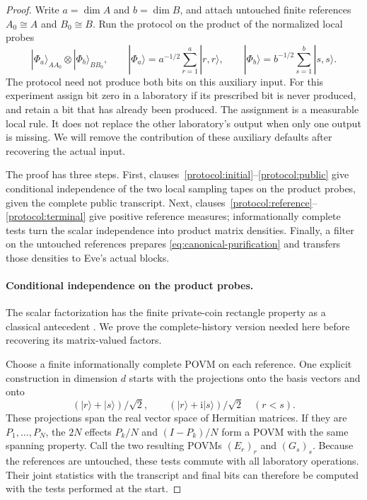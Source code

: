 \begin{proof}
Write $a=\dim A$ and $b=\dim B$, and attach untouched finite references
$A_0\cong A$ and $B_0\cong B$.  Run the protocol on the product of the
normalized local probes
\begin{equation}\label{eq:local-probes}
 |\Phi_a\rangle_{AA_0}\otimes|\Phi_b\rangle_{BB_0},
 \qquad
 |\Phi_a\rangle=a^{-1/2}\sum_{r=1}^{a}|r,r\rangle,
 \qquad
 |\Phi_b\rangle=b^{-1/2}\sum_{s=1}^{b}|s,s\rangle.
\end{equation}
The protocol need not produce both bits on this auxiliary input.  For
this experiment assign bit zero in a laboratory if its prescribed bit
is never produced, and retain a bit that has already been produced.
The assignment is a measurable local rule.  It does not replace the
other laboratory's output when only one output is missing.  We will
remove the contribution of these auxiliary defaults after recovering
the actual input.

The proof has three steps.  First, clauses~\ref{protocol:initial}--\ref{protocol:public}
give conditional independence of the two local sampling tapes on the
product probes, given the complete public transcript.  Next,
clauses~\ref{protocol:reference}--\ref{protocol:terminal} give positive
reference measures; informationally complete tests turn the scalar
independence into product matrix densities.  Finally, a filter on the
untouched references prepares \eqref{eq:canonical-purification}
and transfers those densities to Eve's actual blocks.

\paragraph{Conditional independence on the product probes.}
The scalar factorization has the finite private-coin rectangle property
as a classical antecedent \cite[Lemma~6.7]{BarYossefEtAl2004}.
We prove the complete-history version needed here before recovering its
matrix-valued factors.

Choose a finite informationally complete POVM on each reference.  One
explicit construction in dimension $d$ starts with the projections
onto the basis vectors and onto
\[
 (|r\rangle+|s\rangle)/\sqrt2,
 \qquad
 (|r\rangle+\mathrm i|s\rangle)/\sqrt2
 \quad (r<s).
\]
These projections span the real vector space of Hermitian matrices.  If
they are $P_1,\ldots,P_N$, the $2N$ effects
$P_k/N$ and $(I-P_k)/N$ form a POVM with the same spanning property.
Call the two resulting POVMs $(E_r)_r$ and $(G_s)_s$.  Because the
references are untouched, these tests commute with all laboratory
operations.  Their joint statistics with the transcript and final bits
can therefore be computed with the tests performed at the start.


\end{proof}
